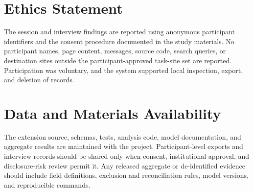 \documentclass[12pt,a4paper]{article}
\begin{document}
\section*{Ethics Statement}

The session and interview findings are reported using anonymous participant identifiers and the consent procedure documented in the study materials. No participant names, page content, messages, source code, search queries, or destination sites outside the participant-approved task-site set are reported. Participation was voluntary, and the system supported local inspection, export, and deletion of records.

\section*{Data and Materials Availability}

The extension source, schemas, tests, analysis code, model documentation, and aggregate results are maintained with the project. Participant-level exports and interview records should be shared only when consent, institutional approval, and disclosure-risk review permit it. Any released aggregate or de-identified evidence should include field definitions, exclusion and reconciliation rules, model versions, and reproducible commands.

\printbibliography[title={References}]
\end{document}
